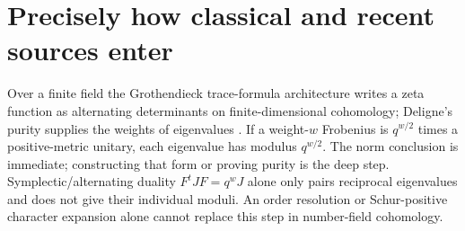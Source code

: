 \section{Precisely how classical and recent sources enter}
Over a finite field the Grothendieck trace-formula architecture writes a zeta function as alternating determinants on finite-dimensional cohomology; Deligne's purity supplies the weights of eigenvalues \cite{SGAFourHalf,DeligneWeilI,DeligneWeilII}. If a weight-$w$ Frobenius is $q^{w/2}$ times a positive-metric unitary, each eigenvalue has modulus $q^{w/2}$. The norm conclusion is immediate; constructing that form or proving purity is the deep step. Symplectic/alternating duality $F^tJF=q^wJ$ alone only pairs reciprocal eigenvalues and does not give their individual moduli. An order resolution or Schur-positive character expansion alone cannot replace this step in number-field cohomology.

